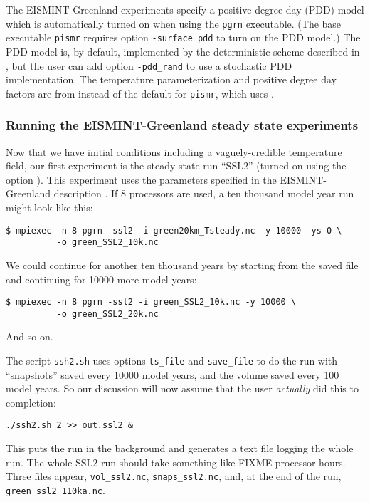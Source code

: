 The EISMINT-Greenland experiments \cite{RitzEISMINT} specify a positive degree day (PDD) model which is automatically turned on when using the \texttt{pgrn} executable.  (The base executable \texttt{pismr} requires option \texttt{-surface pdd} to turn on the PDD model.)  The PDD model is, by default, implemented by the deterministic scheme described in \cite{CalovGreve05}, but the user can add option \texttt{-pdd_rand} to use a stochastic PDD implementation.  The temperature parameterization and positive degree day factors are from \cite{RitzEISMINT} instead of the default for \texttt{pismr}, which uses \cite{Faustoetal2009}.


\subsubsection*{Running the EISMINT-Greenland steady state experiments}  Now that we have initial conditions including a vaguely-credible temperature field, our first experiment is the steady state run ``SSL2'' (turned on using the option ).  This experiment uses the parameters specified in the EISMINT-Greenland description \cite{RitzEISMINT}.  If 8 processors are used, a ten thousand model year run might look like this:

\begin{verbatim}
$ mpiexec -n 8 pgrn -ssl2 -i green20km_Tsteady.nc -y 10000 -ys 0 \
          -o green_SSL2_10k.nc
\end{verbatim}%
\noindent We could continue for another ten thousand years by starting from the saved file and continuing for 10000 more model years:
\begin{verbatim}
$ mpiexec -n 8 pgrn -ssl2 -i green_SSL2_10k.nc -y 10000 \
          -o green_SSL2_20k.nc
\end{verbatim}%
\noindent And so on.

The script \texttt{ssh2.sh} uses options \texttt{ts_file} and \texttt{save_file} to do the run with ``snapshots'' saved every 10000 model years, and the volume saved every 100 model years.  So our discussion will now assume that the user \emph{actually} did this to completion:

\begin{verbatim}
./ssh2.sh 2 >> out.ssl2 &
\end{verbatim}

\noindent This puts the run in the background and generates a text file logging the whole run.  The whole SSL2 run should take something like FIXME processor hours.  Three files appear, \texttt{vol_ssl2.nc}, \texttt{snaps_ssl2.nc}, and, at the end of the run, \texttt{green_ssl2_110ka.nc}.

